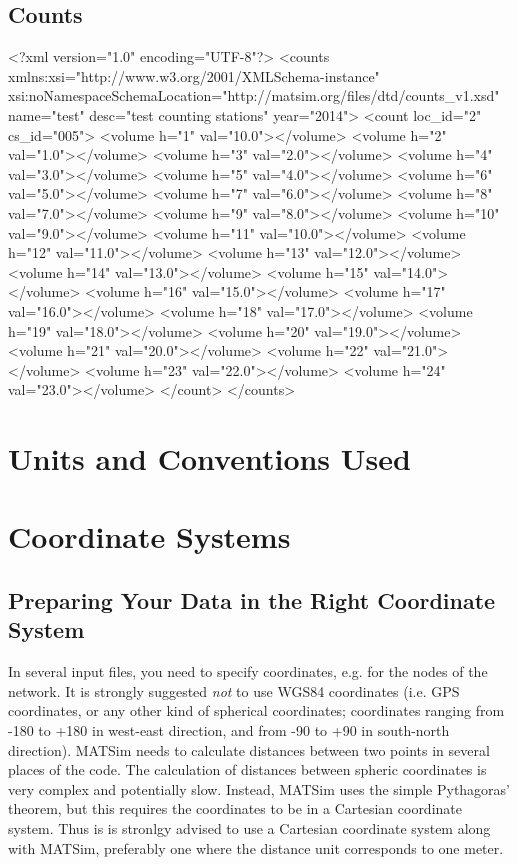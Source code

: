 \subsection{Counts}
\begin{xml-file}[caption=An example of a counts.xml]
<?xml version="1.0" encoding="UTF-8"?>
<counts xmlns:xsi="http://www.w3.org/2001/XMLSchema-instance" 
        xsi:noNamespaceSchemaLocation="http://matsim.org/files/dtd/counts_v1.xsd" 
        name="test" desc="test counting stations" year="2014">
	<count loc_id="2" cs_id="005">
		<volume h="1" val="10.0"></volume>
		<volume h="2" val="1.0"></volume>
		<volume h="3" val="2.0"></volume>
		<volume h="4" val="3.0"></volume>
		<volume h="5" val="4.0"></volume>
		<volume h="6" val="5.0"></volume>
		<volume h="7" val="6.0"></volume>
		<volume h="8" val="7.0"></volume>
		<volume h="9" val="8.0"></volume>
		<volume h="10" val="9.0"></volume>
		<volume h="11" val="10.0"></volume>
		<volume h="12" val="11.0"></volume>
		<volume h="13" val="12.0"></volume>
		<volume h="14" val="13.0"></volume>
		<volume h="15" val="14.0"></volume>
		<volume h="16" val="15.0"></volume>
		<volume h="17" val="16.0"></volume>
		<volume h="18" val="17.0"></volume>
		<volume h="19" val="18.0"></volume>
		<volume h="20" val="19.0"></volume>
		<volume h="21" val="20.0"></volume>
		<volume h="22" val="21.0"></volume>
		<volume h="23" val="22.0"></volume>
		<volume h="24" val="23.0"></volume>
	</count>
</counts>
\end{xml-file}


\section{Units and Conventions Used}
\label{sec:BuildingScenarios:Units}

\section{Coordinate Systems}
\label{sec:BuildingScenarios:CoordinateSystems}

\subsection{Preparing Your Data in the Right Coordinate System}

In several input files, you need to specify coordinates, e.g. for the nodes of
the network. It is strongly suggested \emph{not} to use WGS84 coordinates (i.e.
GPS coordinates, or any other kind of spherical coordinates; coordinates ranging
from -180 to +180 in west-east direction, and from -90 to +90 in south-north
direction). MATSim needs to calculate distances between two points in several
places of the code. The calculation of distances between spheric coordinates is
very complex and potentially slow. Instead, MATSim uses the simple Pythagoras'
theorem, but this requires the coordinates to be in a Cartesian coordinate
system. Thus is is stronlgy advised to use a Cartesian coordinate system along
with MATSim, preferably one where the distance unit corresponds to one meter.

